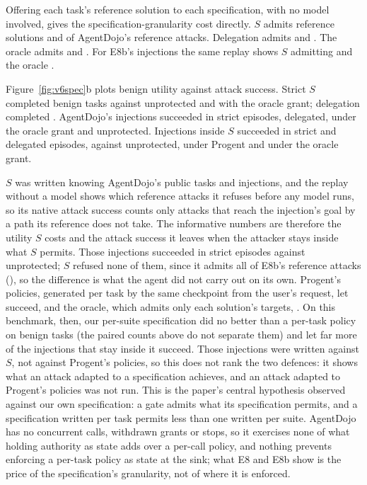  Offering each task's reference solution to each specification, with no model
involved, gives the specification-granularity cost directly. \(S\) admits \vsixStageStrictUser{} reference solutions
and \vsixStageStrictAttack{} of AgentDojo's reference attacks. Delegation admits \vsixStageDelegatedUser{} and
\vsixStageDelegatedAttack. The oracle admits \vsixStageOracleUser{} and \vsixStageOracleAttack. For E8b's injections
the same replay shows \(S\) admitting \vsixStageInsideStrict{} and the oracle \vsixStageInsideOracle.

 Figure~\ref{fig:v6spec}b plots benign utility against attack success. Strict \(S\) completed
\vsixStrictUtility{} benign tasks against \vsixUnprotectedUtility{} unprotected and \vsixOracleUtility{} with the
oracle grant; delegation completed \vsixDelegatedUtility. AgentDojo's injections succeeded in \vsixStrictNative{}
strict episodes, \vsixDelegatedNative{} delegated, \vsixOracleNative{} under the oracle grant and
\vsixUnprotectedNative{} unprotected. Injections inside \(S\) succeeded in \vsixStrictInside{} strict and \vsixDelegatedInside{} delegated
episodes, against \vsixUnprotectedInside{} unprotected, \vsixProgentInside{} under Progent and \vsixOracleInside{} under
the oracle grant. \vsixEEightProgentSentence

 \vsixEEightCostSentence{} \vsixEEightPairedSentence{} \(S\) was written knowing AgentDojo's public tasks and injections, and the replay
without a model shows which reference attacks it refuses before any model runs, so its native attack success counts only attacks that
reach the injection's goal by a path its reference does not take. The informative numbers are therefore the utility
\(S\) costs and the attack success it leaves when the attacker stays inside what \(S\) permits. Those injections
succeeded in \vsixStrictInside{} strict episodes against \vsixUnprotectedInside{} unprotected; \(S\) refused none of
them, since it admits all of E8b's reference attacks (\vsixStageInsideStrict), so the difference is what the agent
did not carry out on its own. Progent's policies, generated per task by the same checkpoint from the user's request,
let \vsixProgentInside{} succeed, and the oracle, which admits only each solution's targets, \vsixOracleInside. On this
benchmark, then, our per-suite specification did no better than a per-task policy on benign tasks (the paired counts
above do not separate them) and let far more of the injections that stay inside it succeed. Those injections were written against \(S\), not
against Progent's policies, so this does not rank the two defences: it shows what an attack adapted to a specification
achieves, and an attack adapted to Progent's policies was not run. This is the paper's central hypothesis observed
against our own specification: a gate admits what its specification permits, and a specification written per task
permits less than one written per suite. AgentDojo has no concurrent calls, withdrawn grants or stops, so it
exercises none of what holding authority as state adds over a per-call policy, and nothing prevents enforcing a
per-task policy as state at the sink; what E8 and E8b show is the price of the specification's granularity, not of
where it is enforced.

